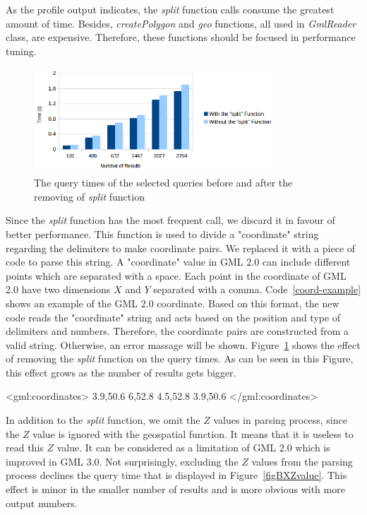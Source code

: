 \documentclass[a4paper,12pt]{article}
\begin{document}
As the profile output indicates, the \textit{split} function calls consume the greatest amount of time. Besides, \textit{createPolygon} and \textit{geo} functions, all used in \textit{GmlReader} class, are expensive. Therefore, these functions should be focused in performance tuning. 
\begin{figure}
\centering
\includegraphics[width=0.8\textwidth,height=0.2\textheight]{BXSplit}
\caption{The query times of the selected queries before and after the removing of \textit{split} function}
\label{figBXSplit}
\end{figure}
Since the \textit{split} function has the most frequent call, we discard it in favour of better performance. This function is used to divide a "coordinate" string regarding the delimiters to make coordinate pairs. We replaced it with a piece of code to parse this string. 
A "coordinate" value in GML 2.0 can include different points which are separated with a space. Each point in the coordinate of GML 2.0 have two dimensions $X$ and $Y$ separated with a comma. Code~\ref{coord-example} shows an example of the GML 2.0 coordinate. Based on this format, the new code reads the "coordinate" string and acts based on the position and type of delimiters and numbers. Therefore, the coordinate pairs are constructed from a valid string. Otherwise, an error massage will be shown. Figure~\ref{figBXSplit} shows the effect of removing the \textit{split} function on the query times. As can be seen in this Figure, this effect grows as the number of results gets bigger.
 
\vspace{10px}
\begin{fakeXML}[label=coord-example,caption=An example of GML 2.0 coordinate]
<gml:coordinates>
  3.9,50.6 6,52.8 4.5,52.8 3.9,50.6
</gml:coordinates>
\end{fakeXML}
\vspace{10px}

In addition to the \textit{split} function, we omit the $Z$ values in parsing process, since the $Z$ value is ignored with the geospatial function. It means that it is useless to read this $Z$ value. It can be considered as a limitation of GML 2.0 which is improved in GML 3.0. Not surprisingly, excluding the $Z$ values from the parsing process declines the query time that is displayed in Figure~\ref{figBXZvalue}. This effect is minor in the smaller number of results and is more obvious with more output numbers.
\end{document}
